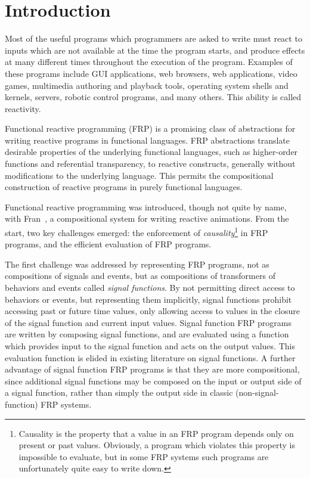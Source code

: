 \chapter{Introduction}
\label{chapter:Introduction}

Most of the useful programs which programmers are asked to write must react to inputs which are not available at the time the program starts,
and produce effects at many different times throughout the execution of the program. Examples of these programs include GUI applications,
web browsers, web applications, video games, multimedia authoring and playback tools, operating system shells and kernels, servers,
robotic control programs, and many others. This ability is called reactivity.

Functional reactive programming (FRP) is a promising class of abstractions for writing reactive programs in functional languages. FRP 
abstractions translate desirable properties of the underlying functional languages, such as higher-order functions and referential
transparency, to reactive constructs, generally without modifications to the underlying language. This permits the compositional
construction of reactive programs in purely functional languages.

Functional reactive programming was introduced, though not quite by name, with Fran~\cite{Elliott1997}, a compositional system for writing
reactive animations. From the start, two key challenges emerged: the enforcement of {\em causality}\footnote{Causality is the property 
that a value in an FRP program depends only on present or past values. Obviously, a program which violates this property is impossible to
evaluate, but in some FRP systems such programs are unfortunately quite easy to write down.} in FRP programs, and the efficient
evaluation of FRP programs.

The first challenge was addressed by representing FRP programs, not as compositions of signals and events, but as compositions of
transformers of behaviors and events called {\em signal functions}. By not permitting direct access to behaviors or events, but
representing them implicitly, signal functions prohibit accessing past or future time values, only allowing access to values in the closure of the signal function
and current input values. Signal function FRP programs are written by composing signal functions, and are evaluated using a function which provides input to the
signal function and acts on the output values. This evaluation function is elided in existing literature on signal functions. 
A further advantage of signal function FRP programs is that they are more compositional, since additional signal functions may be composed
on the input or output side of a signal function, rather than simply the output side in classic (non-signal-function) FRP systems.

